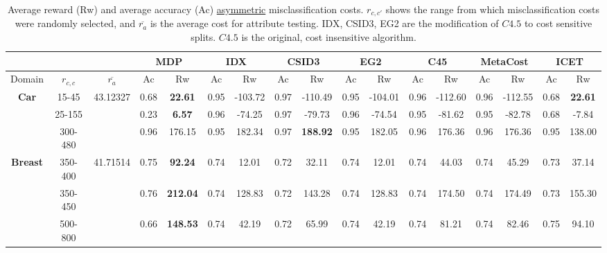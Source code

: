\documentclass[letterpaper]{article}
\theoremstyle{definition}
\begin{document}
\begin{table}[t]
\centering
\scriptsize
\caption{Average reward (Rw) and average accuracy (Ac) \underline{asymmetric} misclassification costs. $r_{c,c'}$ shows the range from which misclassification costs were randomly selected, and $\overline{r_a}$ is the average cost for attribute testing. IDX, CSID3, EG2 are the modification of $C4.5$ to cost sensitive splits. $C4.5$ is the original, cost insensitive algorithm.}
\label{tbl:asymmetric}
\begin{tabular}{|c|c|c|c|c|c|c|c|c|c|c|c|c|c|c|c|c|}
\hline
	&&& \multicolumn{2}{c|}{MDP}     & \multicolumn{2}{c|}{IDX} & \multicolumn{2}{c|}{CSID3}   & \multicolumn{2}{c|}{EG2} & \multicolumn{2}{c|}{C45}    & \multicolumn{2}{c|}{MetaCost} & \multicolumn{2}{c|}{ICET}    \\ \hline
Domain&$r_{c,c}$&$\overline{r_a}$&Ac&Rw&Ac&Rw&Ac&Rw&Ac&Rw&Ac&Rw&Ac&Rw&Ac&Rw \\ \hline

\multirow{3}{*}{\textbf{Car}}       & 15-45     & 43.12327  & 0.68  & \textbf{22.61}   & 0.95      & -103.72      & 0.97   & -110.49           & 0.95      & -104.01      & 0.96      & -112.60      & 0.96         & -112.55        & 0.68   & \textbf{22.61}   \\ \cline{2-17} 
                                    & 25-155    &           & 0.23  & \textbf{6.57}    & 0.96      & -74.25       & 0.97   & -79.73            & 0.96      & -74.54       & 0.95      & -81.62       & 0.95         & -82.78         & 0.68   & -7.84            \\ \cline{2-17} 
                                    & 300-480   &           & 0.96  & 176.15           & 0.95      & 182.34       & 0.97   & \textbf{188.92}   & 0.95      & 182.05       & 0.96      & 176.36       & 0.96         & 176.36         & 0.95   & 138.00           \\ \hline
\multirow{3}{*}{\textbf{Breast}}    & 350-400   & 41.71514  & 0.75  & \textbf{92.24}   & 0.74      & 12.01        & 0.72   & 32.11             & 0.74      & 12.01        & 0.74      & 44.03        & 0.74         & 45.29          & 0.73   & 37.14            \\ \cline{2-17} 
                                    & 350-450   &           & 0.76  & \textbf{212.04}  & 0.74      & 128.83       & 0.72   & 143.28            & 0.74      & 128.83       & 0.74      & 174.50       & 0.74         & 174.49         & 0.73   & 155.30           \\ \cline{2-17} 
                                    & 500-800   &           & 0.66  & \textbf{148.53}  & 0.74      & 42.19        & 0.72   & 65.99             & 0.74      & 42.19        & 0.74      & 81.21        & 0.74         & 82.46          & 0.75   & 94.10            \\ \hline


\end{tabular}
\end{table}
\end{document}
